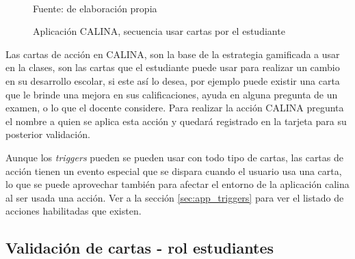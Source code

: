 \begin{figure}[!htb]
\caption[]{Aplicación CALINA, secuencia usar cartas por el estudiante}
\centering
\begin{adjustbox}{width=15cm}
\end{adjustbox}
\\
{\footnotesize Fuente: de elaboración propia}
\end{figure}

Las cartas de acción en CALINA, son la base de la estrategia gamificada a usar en la clases, son las cartas 
que el estudiante puede usar para realizar un cambio en su desarrollo escolar, si este así lo desea, por 
ejemplo puede existir una carta que le brinde una mejora en sus calificaciones, ayuda en alguna pregunta de 
un examen, o lo que el docente considere. Para realizar la acción CALINA pregunta el nombre a quien se aplica 
esta acción y quedará registrado en la tarjeta para su posterior validación.

Aunque los \textit{triggers} pueden se pueden usar con todo tipo de cartas, las cartas de acción tienen un 
evento especial que se dispara cuando el usuario usa una carta, lo que se puede aprovechar también para 
afectar el entorno de la aplicación calina al ser usada una acción. Ver a la sección \ref{sec:app_triggers} 
para ver el listado de acciones habilitadas que existen.

\subsection{Validación de cartas - rol estudiantes}

